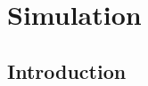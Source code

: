 \documentclass[../main.tex]{subfiles}
\begin{document}
\section{Simulation}\label{sec:simulation}
\subsection{Introduction}
\end{document}
